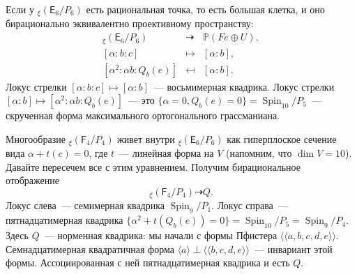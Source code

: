 \documentclass[a4paper]{article}
\DeclareMathOperator{\Spin}{Spin}
\theoremstyle{definition}
\newcommand{\la}{\langle}
\newcommand{\ra}{\rangle}
\newcommand{\lAngle}{\langle\!\langle}
\newcommand{\rAngle}{\rangle\!\rangle}
\begin{document}
Если у ${}_{\xi}(\mathsf{E}_6/P_6)$ есть рациональная точка,
то есть большая клетка, и оно бирационально эквивалентно
проективному пространству:
\begin{eqnarray*}
{}_{\xi}(\mathsf{E}_6/P_6) & \dashrightarrow
& \mathbb{P}(Fe\oplus U),\\
{}[\alpha:b:c] & \mapsto & [\alpha:b],\\
{}[\alpha^2:\alpha b:Q_b(e)] & \mapsfrom & [\alpha:b].
\end{eqnarray*}
Локус стрелки $[\alpha:b:c]\mapsto [\alpha:b]$~--- восьмимерная
квадрика.
Локус стрелки $[\alpha:b]\mapsto [\alpha^2:\alpha b:Q_b(e)]$~---
это $\{\alpha=0, Q_b(e)=0\} = \Spin_{10}/P_5$~--- скрученная
форма максимального ортогонального грассманиана.

Многообразие ${}_{\xi}(\mathsf{F}_4/P_4)$ живет внутри
${}_{\xi}(\mathsf{E}_6/P_6)$ как гиперплоское сечение
вида $\alpha + t(c) = 0$, где $t$~--- линейная форма на $V$
(напомним, что $\dim V = 10$).
Давайте пересечем все с этим уравнением.
Получим бирациональное отображение
\[
{}_{\xi}(\mathsf{F}_4/P_4) \dashrightarrow Q.
\]
Локус слева~--- семимерная квадрика $\Spin_9/P_1$.
Локус справа~--- пятнадцатимерная квадрика
$\{\alpha^2 + t(Q_b(e)) = 0\} = \Spin_{10}/P_5 = \Spin_9 / P_4$.
Здесь $Q$~--- норменная квадрика:
мы начали с формы Пфистера $\lAngle a,b,c,d,e\rAngle$.
Семнадцатимерная
квадратичная форма $\la a\ra\perp \lAngle b,c,d,e\rAngle$~---
инвариант этой формы.
Ассоциированная с ней пятнадцатимерная квадрика и есть $Q$.
\end{document}

